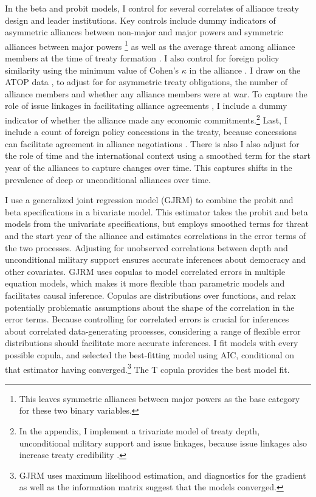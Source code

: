 \documentclass[12pt]{article}
\begin{document}
In the beta and probit models, I control for several correlates of alliance treaty design and leader institutions. 
Key controls include dummy indicators of asymmetric alliances between non-major and major powers and symmetric alliances between major powers \citep{Mattes2012}\footnote{This leaves symmetric alliances between major powers as the base category for these two binary variables.} as well as the average threat among alliance members at the time of treaty formation \citep{LeedsSavun2007}. 
I also control for foreign policy similarity using the minimum value of Cohen's $\kappa$ in the alliance \citep{Hage2011}.
I draw on the ATOP data \citep{Leedsetal2002}, to adjust for for asymmetric treaty obligations, the number of alliance members and whether any alliance members were at war. 
To capture the role of issue linkages in facilitating alliance agreements \citep{Poast2012}, I include a dummy indicator of whether the alliance made any economic commitments.\footnote{In the appendix, I implement a trivariate model of treaty depth, unconditional military support and issue linkages, because issue linkages also increase treaty credibility \citep{ Poast2013}.}  
Last, I include a count of foreign policy concessions in the treaty, because concessions can facilitate agreement in alliance negotiations \citep{Johnson2015}. 
There is also I also adjust for the role of time and the international context using a smoothed term for the start year of the alliances to capture changes over time.
This captures shifts in the prevalence of deep or unconditional alliances over time.  


I use a generalized joint regression model (GJRM) \citep{Braumoelleretal2018} to combine the probit and beta specifications in a bivariate model.
This estimator takes the probit and beta models from the univariate specifications, but employs smoothed terms for threat and the start year of the alliance and estimates correlations in the error terms of the two processes. 
Adjusting for unobserved correlations between depth and unconditional military support ensures accurate inferences about democracy and other covariates.
GJRM uses copulas to model correlated errors in multiple equation models, which makes it more flexible than parametric models and facilitates causal inference. 
Copulas are distributions over functions, and relax potentially problematic assumptions about the shape of the correlation in the error terms. 
Because controlling for correlated errors is crucial for inferences about correlated data-generating processes, considering a range of flexible error distributions should facilitate more accurate inferences. 
I fit models with every possible copula, and selected the best-fitting model using AIC, conditional on that estimator having converged.\footnote{GJRM uses maximum likelihood estimation, and diagnostics for the gradient as well as the information matrix suggest that the models converged.} 
The T copula provides the best model fit.
\end{document}
